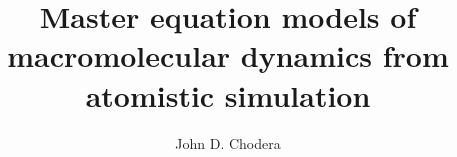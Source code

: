 \documentclass[draft,11pt]{ucthesis}
\begin{document}
\begin{frontmatter}

\title{Master equation models of macromolecular dynamics from atomistic simulation}
\author{John D. Chodera}

\maketitle
\copyrightpage

\begin{dedication}
\null\vfil
{\large
\begin{center}

\end{center}}
\vfil\null
\end{dedication}

\begin{acknowledgements}

\end{acknowledgements}

\begin{abstract}

\abstractsignature
\end{abstract}

\tableofcontents
\listoffigures
\listoftables

\end{frontmatter}
\end{document}
